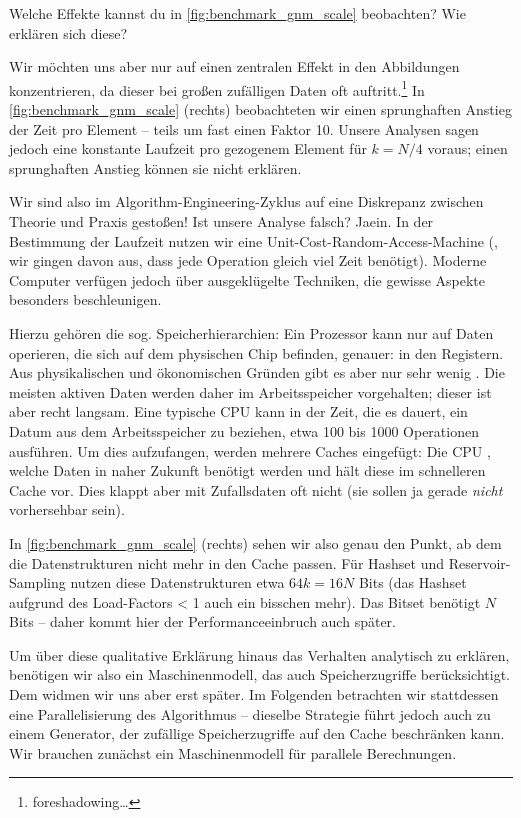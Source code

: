 \begin{exercise}
    Welche Effekte kannst du in \cref{fig:benchmark_gnm_scale} beobachten? Wie erklären sich diese?
\end{exercise}

Wir möchten uns aber nur auf einen zentralen Effekt in den Abbildungen konzentrieren, da dieser bei großen zufälligen Daten oft auftritt.\footnote{foreshadowing\ldots}
In \cref{fig:benchmark_gnm_scale} (rechts) beobachteten wir einen sprunghaften Anstieg der Zeit pro Element -- teils um fast einen Faktor 10.
Unsere Analysen sagen jedoch eine konstante Laufzeit pro gezogenem Element für $k = N/4$ voraus; einen sprunghaften Anstieg können sie nicht erklären.

Wir sind also im Algorithm-Engineering-Zyklus auf eine Diskrepanz zwischen Theorie und Praxis gestoßen!
Ist unsere Analyse falsch? Jaein.
In der Bestimmung der Laufzeit nutzen wir eine Unit-Cost-Random-Access-Machine (\dh, wir gingen davon aus, dass jede Operation gleich viel Zeit benötigt).
Moderne Computer verfügen jedoch über ausgeklügelte Techniken, die gewisse Aspekte besonders beschleunigen.

Hierzu gehören die sog. Speicherhierarchien: Ein Prozessor kann nur auf Daten operieren, die sich auf dem physischen Chip befinden, genauer: in den Registern.
Aus physikalischen und ökonomischen Gründen gibt es aber nur sehr wenig .
Die meisten aktiven Daten werden daher im Arbeitsspeicher vorgehalten; dieser ist aber recht langsam.
Eine typische CPU kann in der Zeit, die es dauert, ein Datum aus dem Arbeitsspeicher zu beziehen, etwa 100 bis 1000 Operationen ausführen.
Um dies aufzufangen, werden mehrere Caches eingefügt: Die CPU , welche Daten in naher Zukunft benötigt werden und hält diese im schnelleren Cache vor.
Dies klappt aber mit Zufallsdaten oft nicht (sie sollen ja gerade \emph{nicht} vorhersehbar sein).

In \cref{fig:benchmark_gnm_scale} (rechts) sehen wir also genau den Punkt, ab dem die Datenstrukturen nicht mehr in den Cache passen.
Für Hashset und Reservoir-Sampling nutzen diese Datenstrukturen etwa $64 k = 16 N$ Bits (das Hashset aufgrund des Load-Factors < 1 auch ein bisschen mehr).
Das Bitset benötigt $N$ Bits -- daher kommt hier der Performanceeinbruch auch später.

Um über diese qualitative Erklärung hinaus das Verhalten analytisch zu erklären, benötigen wir also ein Maschinenmodell, das auch Speicherzugriffe berücksichtigt.
Dem widmen wir uns aber erst später.
Im Folgenden betrachten wir stattdessen eine Parallelisierung des Algorithmus -- dieselbe Strategie führt jedoch auch zu einem Generator, der zufällige Speicherzugriffe auf den Cache beschränken kann.
Wir brauchen zunächst ein Maschinenmodell für parallele Berechnungen.


